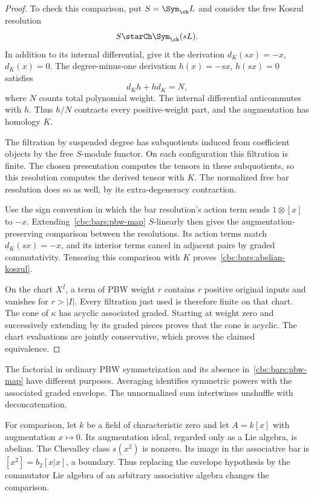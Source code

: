 \begin{proof}
To check this comparison, put $S=\Sym_{\ch}L$ and consider the free Koszul resolution
\[
 S\starCh\Sym_{\ch}(sL).
\]
In addition to its internal differential, give it the derivation $d_K(sx)=-x$, $d_K(x)=0$. The degree-minus-one derivation $h(x)=-sx$, $h(sx)=0$ satisfies
\[
 d_Kh+hd_K=N,
\]
where $N$ counts total polynomial weight. The internal differential anticommutes with $h$. Thus $h/N$ contracts every positive-weight part, and the augmentation has homology $K$.

The filtration by suspended degree has subquotients induced from coefficient objects by the free $S$-module functor. On each configuration this filtration is finite. The chosen presentation computes the tensors in these subquotients, so this resolution computes the derived tensor with $K$. The normalized free bar resolution does so as well, by its extra-degeneracy contraction.

Use the sign convention in which the bar resolution's action term sends $1\otimes[x]$ to $-x$. Extending~\eqref{cbc:bars:pbw-map} $S$-linearly then gives the augmentation-preserving comparison between the resolutions. Its action terms match $d_K(sx)=-x$, and its interior terms cancel in adjacent pairs by graded commutativity. Tensoring this comparison with $K$ proves~\eqref{cbc:bars:abelian-koszul}.

On the chart $X^I$, a term of PBW weight $r$ contains $r$ positive original inputs and vanishes for $r>|I|$. Every filtration just used is therefore finite on that chart. The cone of $\kappa$ has acyclic associated graded. Starting at weight zero and successively extending by its graded pieces proves that the cone is acyclic. The chart evaluations are jointly conservative, which proves the claimed equivalence.
\end{proof}

The factorial in ordinary PBW symmetrization and its absence in~\eqref{cbc:bars:pbw-map} have different purposes. Averaging identifies symmetric powers with the associated graded envelope. The unnormalized sum intertwines unshuffle with deconcatenation.

For comparison, let $k$ be a field of characteristic zero and let $A=k[x]$ with augmentation $x\mapsto0$. Its augmentation ideal, regarded only as a Lie algebra, is abelian. The Chevalley class $s(x^2)$ is nonzero. Its image in the associative bar is $[x^2]=b_2[x|x]$, a boundary. Thus replacing the envelope hypothesis by the commutator Lie algebra of an arbitrary associative algebra changes the comparison.

